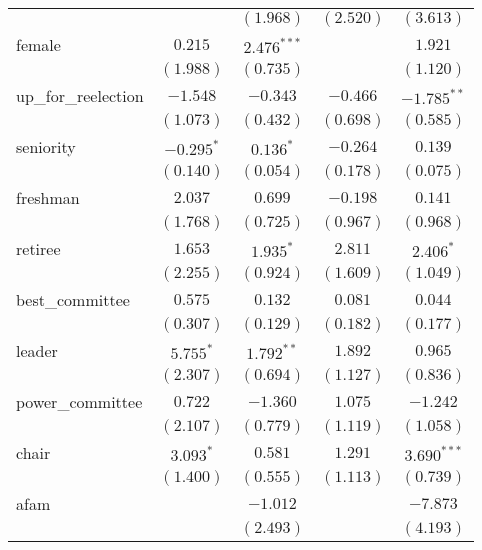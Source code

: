 \documentclass[12pt]{article}
\begin{document}
\begin{table}
\begin{center}
\begin{tabular}{l c c c c }
			&                & $(1.968)$      & $(2.520)$      & $(3.613)$     \\
			female                 & $0.215$        & $2.476^{***}$  &                & $1.921$       \\
			& $(1.988)$      & $(0.735)$      &                & $(1.120)$     \\
			up\_for\_reelection    & $-1.548$       & $-0.343$       & $-0.466$       & $-1.785^{**}$ \\
			& $(1.073)$      & $(0.432)$      & $(0.698)$      & $(0.585)$     \\
			seniority              & $-0.295^{*}$   & $0.136^{*}$    & $-0.264$       & $0.139$       \\
			& $(0.140)$      & $(0.054)$      & $(0.178)$      & $(0.075)$     \\
			freshman               & $2.037$        & $0.699$        & $-0.198$       & $0.141$       \\
			& $(1.768)$      & $(0.725)$      & $(0.967)$      & $(0.968)$     \\
			retiree                & $1.653$        & $1.935^{*}$    & $2.811$        & $2.406^{*}$   \\
			& $(2.255)$      & $(0.924)$      & $(1.609)$      & $(1.049)$     \\
			best\_committee        & $0.575$        & $0.132$        & $0.081$        & $0.044$       \\
			& $(0.307)$      & $(0.129)$      & $(0.182)$      & $(0.177)$     \\
			leader                 & $5.755^{*}$    & $1.792^{**}$   & $1.892$        & $0.965$       \\
			& $(2.307)$      & $(0.694)$      & $(1.127)$      & $(0.836)$     \\
			power\_committee       & $0.722$        & $-1.360$       & $1.075$        & $-1.242$      \\
			& $(2.107)$      & $(0.779)$      & $(1.119)$      & $(1.058)$     \\
			chair                  & $3.093^{*}$    & $0.581$        & $1.291$        & $3.690^{***}$ \\
			& $(1.400)$      & $(0.555)$      & $(1.113)$      & $(0.739)$     \\
			afam                   &                & $-1.012$       &                & $-7.873$      \\
			&                & $(2.493)$      &                & $(4.193)$     \\

\end{tabular}
\end{center}
\end{table}
\end{document}
